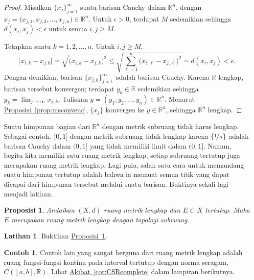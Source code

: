 \documentclass[12pt,openany]{book}
\newcommand{\R}{{\mathbb{R}}}
\theoremstyle{plain}
\newtheorem{prop}[thm]{Proposisi}
\theoremstyle{remark}
\theoremstyle{definition}
\newenvironment{exbox}{%
    \def\FrameCommand{\vrule width 1pt \relax\hspace{10pt}}%
    \MakeFramed{\advance\hsize-\width\FrameRestore}%
}{%
    \endMakeFramed
}
\theoremstyle{exercise}
\newtheorem{exercise}{Latihan}[section]
\theoremstyle{example}
\newtheorem{example}[thm]{Contoh}
\newcommand{\propref}[1]{\hyperref[#1]{Proposisi~\ref*{#1}}}
\newcommand{\corref}[1]{\hyperref[#1]{Akibat~\ref*{#1}}}
\begin{document}
\begin{proof}
Misalkan $\{ x_j \}_{j=1}^\infty$ suatu barisan Cauchy
dalam $\R^n$, dengan $x_j = \bigl(x_{j,1},x_{j,2},\ldots,x_{j,n}\bigr) \in \R^n$.
Untuk $\epsilon > 0$, terdapat $M$ sedemikian sehingga
$d(x_i,x_j) < \epsilon$
untuk semua
$i,j \geq M$.

Tetapkan suatu $k=1,2,\ldots,n$. Untuk $i,j \geq M$,
\begin{equation*}
\bigl\lvert x_{i,k} - x_{j,k} \bigr\rvert
=
\sqrt{{\bigl(x_{i,k} - x_{j,k}\bigr)}^2}
\leq
\sqrt{\sum_{\ell=1}^n {\bigl(x_{i,\ell}-x_{j,\ell}\bigr)}^2}
= d(x_i,x_j) < \epsilon .
\end{equation*}
Dengan demikian, barisan $\{ x_{j,k} \}_{j=1}^\infty$ adalah barisan Cauchy. Karena $\R$
lengkap, barisan tersebut konvergen; terdapat $y_k \in \R$ sedemikian sehingga
$y_k = \lim_{j\to\infty} x_{j,k}$.
Tuliskan $y = (y_1,y_2,\ldots,y_n) \in \R^n$.
Menurut \propref{prop:msconveuc}, $\{ x_j \}$ konvergen
ke $y \in \R^n$, sehingga $\R^n$ lengkap.
\end{proof}

Suatu himpunan bagian dari $\R^n$ dengan metrik subruang tidak harus
lengkap. Sebagai contoh, $(0,1]$ dengan metrik subruang tidak
lengkap karena $\{ \nicefrac{1}{n} \}$ adalah barisan Cauchy dalam $(0,1]$
yang tidak memiliki limit dalam $(0,1]$.
Namun,
begitu kita memiliki satu ruang metrik lengkap, setiap subruang tertutup juga
merupakan ruang metrik lengkap. Lagi pula, salah satu cara
untuk memandang suatu himpunan tertutup adalah bahwa ia memuat semua titik
yang dapat dicapai dari himpunan tersebut melalui suatu barisan.
Buktinya sekali lagi menjadi latihan.

\begin{prop} \label{prop:closedcomplete}
Andaikan $(X,d)$ ruang metrik lengkap dan $E \subset X$
tertutup. Maka $E$ merupakan ruang metrik lengkap dengan topologi subruang.
\end{prop}

\begin{exbox}
\begin{exercise}%
Buktikan \propref{prop:closedcomplete}.
\end{exercise}
\end{exbox}

\begin{example}
Contoh lain yang sangat berguna dari ruang metrik lengkap adalah ruang
fungsi-fungsi kontinu pada interval tertutup dengan norma seragam, $C([a,b],\R)$.
Lihat \corref{cor:CSRcomplete} dalam lampiran berikutnya.
\end{example}
\end{document}
